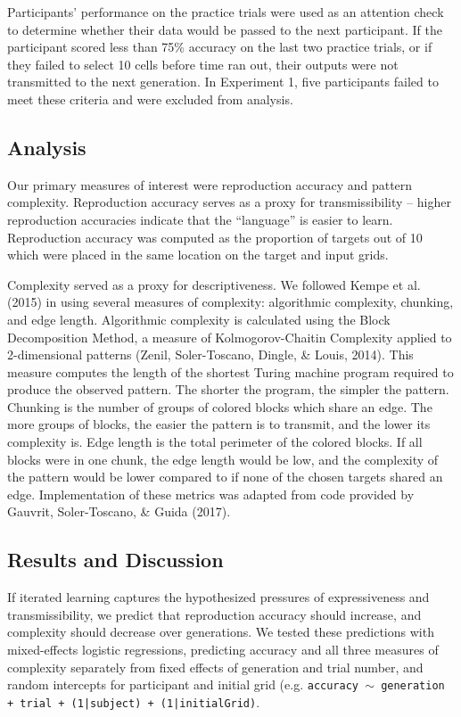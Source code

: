 \documentclass[10pt, letterpaper]{article}
\begin{document}
Participants' performance on the practice trials were used as an
attention check to determine whether their data would be passed to the
next participant. If the participant scored less than 75\% accuracy on
the last two practice trials, or if they failed to select 10 cells
before time ran out, their outputs were not transmitted to the next
generation. In Experiment 1, five participants failed to meet these
criteria and were excluded from analysis.

\hypertarget{analysis}{%
\subsection{Analysis}\label{analysis}}

Our primary measures of interest were reproduction accuracy and pattern
complexity. Reproduction accuracy serves as a proxy for transmissibility
-- higher reproduction accuracies indicate that the ``language'' is
easier to learn. Reproduction accuracy was computed as the proportion of
targets out of 10 which were placed in the same location on the target
and input grids.

Complexity served as a proxy for descriptiveness. We followed Kempe et
al. (2015) in using several measures of complexity: algorithmic
complexity, chunking, and edge length. Algorithmic complexity is
calculated using the Block Decomposition Method, a measure of
Kolmogorov-Chaitin Complexity applied to 2-dimensional patterns (Zenil,
Soler-Toscano, Dingle, \& Louis, 2014). This measure computes the length
of the shortest Turing machine program required to produce the observed
pattern. The shorter the program, the simpler the pattern. Chunking is
the number of groups of colored blocks which share an edge. The more
groups of blocks, the easier the pattern is to transmit, and the lower
its complexity is. Edge length is the total perimeter of the colored
blocks. If all blocks were in one chunk, the edge length would be low,
and the complexity of the pattern would be lower compared to if none of
the chosen targets shared an edge. Implementation of these metrics was
adapted from code provided by Gauvrit, Soler-Toscano, \& Guida (2017).

\hypertarget{results-and-discussion}{%
\subsection{Results and Discussion}\label{results-and-discussion}}

If iterated learning captures the hypothesized pressures of
expressiveness and transmissibility, we predict that reproduction
accuracy should increase, and complexity should decrease over
generations. We tested these predictions with mixed-effects logistic
regressions, predicting accuracy and all three measures of complexity
separately from fixed effects of generation and trial number, and random
intercepts for participant and initial grid (e.g.
\texttt{accuracy $\sim$ generation + trial +  (1|subject) + (1|initialGrid)}.
\end{document}
